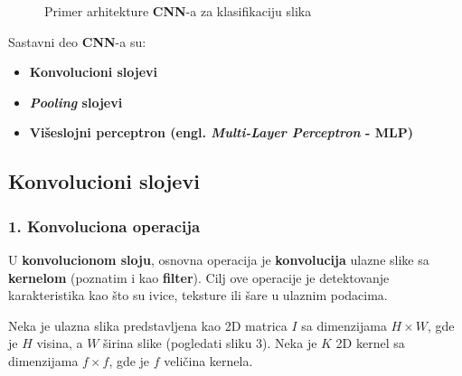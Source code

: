 \documentclass[12pt]{article}
\begin{document}
     \begin{figure}[h!]
      \centering
      \caption{Primer arhitekture \textbf{CNN}-a za klasifikaciju slika}
      \label{fig:cnn_architecture}
    \end{figure}
    
    \vspace{0.7cm}
   
    Sastavni deo \textbf{CNN}-a su:
    \begin{itemize}
      \vspace{-0.5cm}
      \setlength\itemsep{0em}
      \item \textbf{Konvolucioni slojevi}
      \item \textbf{\textit{Pooling} slojevi}
      \item \textbf{Višeslojni perceptron (engl. \textbf{\textit{Multi-Layer Perceptron}} - \textbf{MLP})}
   \end{itemize}

   \newpage

   \subsection*{Konvolucioni slojevi}
   \subsubsection*{1. Konvoluciona operacija}
   U \textbf{konvolucionom sloju}, osnovna operacija je \textbf{konvolucija} ulazne slike sa \textbf{kernelom} (poznatim i kao \textbf{filter}).
   Cilj ove operacije je detektovanje karakteristika kao što su ivice, teksture 
   ili šare u ulaznim podacima.

   Neka je ulazna slika predstavljena kao 2D matrica \( I \) 
   sa dimenzijama \( H \times W \), gde je \( H \) visina, 
   a \( W \) širina slike (pogledati sliku 3). Neka je \( K \) 2D kernel sa 
   dimenzijama \( f \times f \), gde je \( f \) veličina kernela.
   
\end{document}
